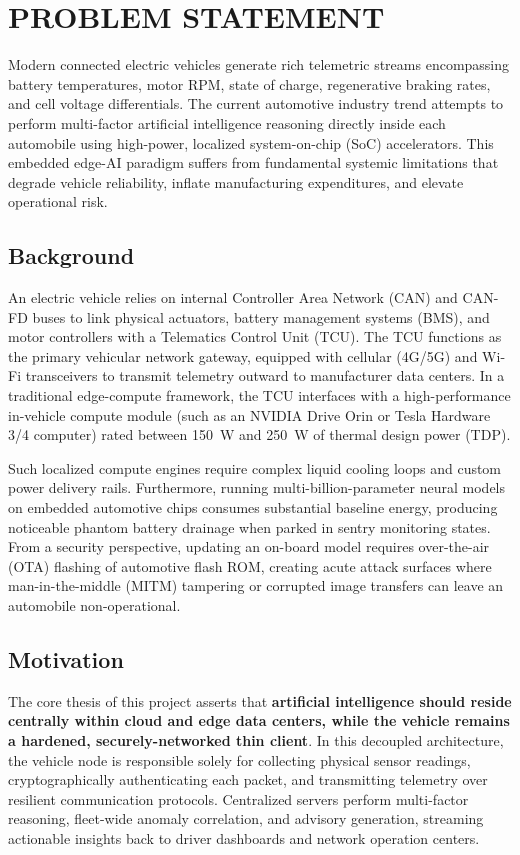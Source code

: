 \documentclass[12pt,a4paper]{report}
\begin{document}
\section{PROBLEM STATEMENT}
Modern connected electric vehicles generate rich telemetric streams encompassing battery temperatures, motor RPM, state of charge, regenerative braking rates, and cell voltage differentials. The current automotive industry trend attempts to perform multi-factor artificial intelligence reasoning directly inside each automobile using high-power, localized system-on-chip (SoC) accelerators. This embedded edge-AI paradigm suffers from fundamental systemic limitations that degrade vehicle reliability, inflate manufacturing expenditures, and elevate operational risk.

\subsection{Background}
An electric vehicle relies on internal Controller Area Network (CAN) and CAN-FD buses to link physical actuators, battery management systems (BMS), and motor controllers with a Telematics Control Unit (TCU). The TCU functions as the primary vehicular network gateway, equipped with cellular (4G/5G) and Wi-Fi transceivers to transmit telemetry outward to manufacturer data centers. In a traditional edge-compute framework, the TCU interfaces with a high-performance in-vehicle compute module (such as an NVIDIA Drive Orin or Tesla Hardware 3/4 computer) rated between 150~W and 250~W of thermal design power (TDP).

Such localized compute engines require complex liquid cooling loops and custom power delivery rails. Furthermore, running multi-billion-parameter neural models on embedded automotive chips consumes substantial baseline energy, producing noticeable phantom battery drainage when parked in sentry monitoring states. From a security perspective, updating an on-board model requires over-the-air (OTA) flashing of automotive flash ROM, creating acute attack surfaces where man-in-the-middle (MITM) tampering or corrupted image transfers can leave an automobile non-operational.

\subsection{Motivation}
The core thesis of this project asserts that \textbf{artificial intelligence should reside centrally within cloud and edge data centers, while the vehicle remains a hardened, securely-networked thin client}. In this decoupled architecture, the vehicle node is responsible solely for collecting physical sensor readings, cryptographically authenticating each packet, and transmitting telemetry over resilient communication protocols. Centralized servers perform multi-factor reasoning, fleet-wide anomaly correlation, and advisory generation, streaming actionable insights back to driver dashboards and network operation centers.
\end{document}
